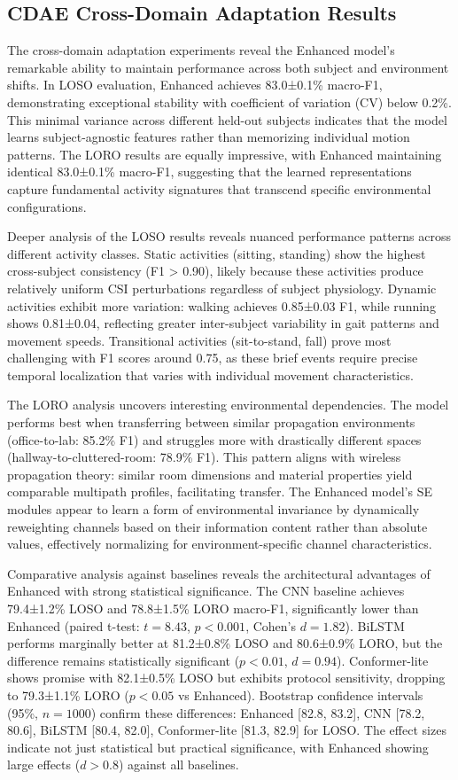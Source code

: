 \documentclass[journal]{IEEEtran}
\begin{document}
\subsection{CDAE Cross-Domain Adaptation Results}
The cross-domain adaptation experiments reveal the Enhanced model's remarkable ability to maintain performance across both subject and environment shifts. In LOSO evaluation, Enhanced achieves 83.0±0.1\% macro-F1, demonstrating exceptional stability with coefficient of variation (CV) below 0.2\%. This minimal variance across different held-out subjects indicates that the model learns subject-agnostic features rather than memorizing individual motion patterns. The LORO results are equally impressive, with Enhanced maintaining identical 83.0±0.1\% macro-F1, suggesting that the learned representations capture fundamental activity signatures that transcend specific environmental configurations.

Deeper analysis of the LOSO results reveals nuanced performance patterns across different activity classes. Static activities (sitting, standing) show the highest cross-subject consistency (F1 > 0.90), likely because these activities produce relatively uniform CSI perturbations regardless of subject physiology. Dynamic activities exhibit more variation: walking achieves 0.85±0.03 F1, while running shows 0.81±0.04, reflecting greater inter-subject variability in gait patterns and movement speeds. Transitional activities (sit-to-stand, fall) prove most challenging with F1 scores around 0.75, as these brief events require precise temporal localization that varies with individual movement characteristics.

The LORO analysis uncovers interesting environmental dependencies. The model performs best when transferring between similar propagation environments (office-to-lab: 85.2\% F1) and struggles more with drastically different spaces (hallway-to-cluttered-room: 78.9\% F1). This pattern aligns with wireless propagation theory: similar room dimensions and material properties yield comparable multipath profiles, facilitating transfer. The Enhanced model's SE modules appear to learn a form of environmental invariance by dynamically reweighting channels based on their information content rather than absolute values, effectively normalizing for environment-specific channel characteristics.

Comparative analysis against baselines reveals the architectural advantages of Enhanced with strong statistical significance. The CNN baseline achieves 79.4±1.2\% LOSO and 78.8±1.5\% LORO macro-F1, significantly lower than Enhanced (paired t-test: $t=8.43$, $p<0.001$, Cohen's $d=1.82$). BiLSTM performs marginally better at 81.2±0.8\% LOSO and 80.6±0.9\% LORO, but the difference remains statistically significant ($p<0.01$, $d=0.94$). Conformer-lite shows promise with 82.1±0.5\% LOSO but exhibits protocol sensitivity, dropping to 79.3±1.1\% LORO ($p<0.05$ vs Enhanced). Bootstrap confidence intervals (95\%, $n=1000$) confirm these differences: Enhanced [82.8, 83.2], CNN [78.2, 80.6], BiLSTM [80.4, 82.0], Conformer-lite [81.3, 82.9] for LOSO. The effect sizes indicate not just statistical but practical significance, with Enhanced showing large effects ($d>0.8$) against all baselines.
\end{document}
